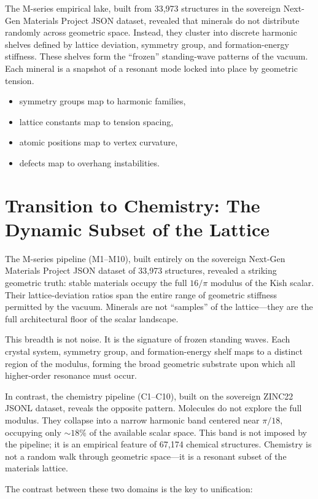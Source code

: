 \documentclass[11pt, letterpaper, openany]{book}
\begin{document}
The M-series empirical lake, built from 33,973 structures in the sovereign Next-Gen Materials
Project JSON dataset, revealed that minerals do not distribute randomly across geometric space.
Instead, they cluster into discrete harmonic shelves defined by lattice deviation, symmetry group,
and formation-energy stiffness. These shelves form the ``frozen'' standing-wave patterns of the
vacuum. Each mineral is a snapshot of a resonant mode locked into place by geometric tension.


\begin{itemize}
    \item symmetry groups map to harmonic families,
    \item lattice constants map to tension spacing,
    \item atomic positions map to vertex curvature,
    \item defects map to overhang instabilities.
\end{itemize}

\section{Transition to Chemistry: The Dynamic Subset of the Lattice}
The M-series pipeline (M1--M10), built entirely on the sovereign Next-Gen Materials Project JSON dataset of 33,973 structures, revealed a striking geometric truth: stable materials occupy the full $16/\pi$ modulus of the Kish scalar. Their lattice-deviation ratios span the entire range of geometric stiffness permitted by the vacuum. Minerals are not ``samples'' of the lattice---they are the full architectural floor of the scalar landscape.

This breadth is not noise. It is the signature of frozen standing waves. Each crystal system, symmetry group, and formation-energy shelf maps to a distinct region of the modulus, forming the broad geometric substrate upon which all higher-order resonance must occur.

In contrast, the chemistry pipeline (C1--C10), built on the sovereign ZINC22 JSONL dataset, reveals the opposite pattern. Molecules do not explore the full modulus. They collapse into a narrow harmonic band centered near $\pi/18$, occupying only $\sim 18\%$ of the available scalar space. This band is not imposed by the pipeline; it is an empirical feature of 67,174 chemical structures. Chemistry is not a random walk through geometric space---it is a resonant subset of the materials lattice.

The contrast between these two domains is the key to unification:
\end{document}
